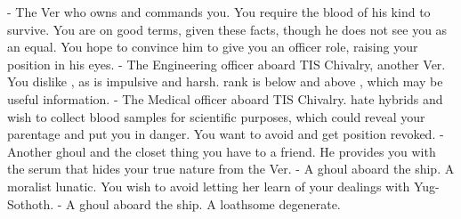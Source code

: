 \documentclass[char]{guildcamp4}
\begin{document}
\begin{contacts}
	\contact{\cVone{}} - The Ver who owns and commands you. You require the blood of his kind to survive. You are on good terms, given these facts, though he does not see you as an equal. You hope to convince him to give you an officer role, raising your position in his eyes.
	\contact{\cVtwo{}} - The Engineering officer aboard TIS Chivalry, another Ver. You dislike \cVtwo{\them}, as \cVtwo{\they} is impulsive and harsh. \cVtwo{\their} rank is below \cVone{} and above \cVthree{}, which may be useful information.
	\contact{\cVthree{}} - The Medical officer aboard TIS Chivalry. \cVthree{\They} hate hybrids and wish to collect blood samples for scientific purposes, which could reveal your parentage and put you in danger. You want to avoid \cVthree{\them} and get \cVthree{\their} position revoked.
	\contact{\cJames{}} - Another ghoul and the closet thing you have to a friend. He provides you with the serum that hides your true nature from the Ver. 
	\contact{\cJoan{}} - A ghoul aboard the ship. A moralist lunatic. You wish to avoid letting her learn of your dealings with Yug-Sothoth.  
	\contact{\cJulie{}} - A ghoul aboard the ship. A loathsome degenerate. 
\end{contacts}

\end{document}
